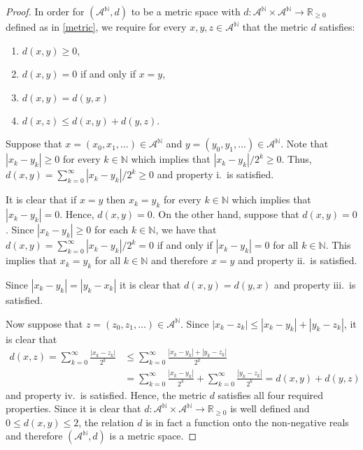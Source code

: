 \begin{proof}
  In order for $(\mathcal{A}^\mathbb{N}, d)$ to be a metric space
  with $d: \mathcal{A}^\mathbb{N} \times \mathcal{A}^\mathbb{N} \to \mathbb{R}_{\geq 0}$
  defined as in \eqref{metric}, we require for every $x, y, z \in \mathcal{A}^\mathbb{N}$ that the metric $d$ satisfies:
  \begin{enumerate}
    \item $d(x, y) \geq 0$,
    \item $d(x, y) = 0$ if and only if $x = y$,
    \item $d(x, y) = d(y, x)$
    \item $d(x, z) \leq d(x, y) + d(y, z)$.
  \end{enumerate}

  Suppose that $x = (x_0, x_1, \dots) \in \mathcal{A}^\mathbb{N}$ and $y = (y_0, y_1, \dots) \in \mathcal{A}^\mathbb{N}$. Note
  that $|x_k - y_k| \geq 0$ for every $k \in \mathbb{N}$ which implies that $|x_k - y_k| / 2^k \geq 0$. Thus,
  $d(x, y) = \sum_{k=0}^\infty |x_k - y_k| / 2^k \geq 0$ and property i.\ is satisfied.

  It is clear that if $x = y$ then $x_k = y_k$ for every $k\in \mathbb{N}$ which implies that
  $|x_k - y_k| = 0$. Hence, $d(x, y) = 0$. On the other hand, suppose that $d(x, y) = 0$.
  Since $|x_k - y_k| \geq 0$ for each $k\in\mathbb{N}$, we have that $d(x, y) = \sum_{k=0}^\infty |x_k - y_k|/2^k = 0$
  if and only if $|x_k - y_k| = 0$ for all $k\in\mathbb{N}$. This implies that
  $x_k = y_k$ for all $k \in \mathbb{N}$ and therefore $x = y$ and property ii.\ is satisfied.

  Since $|x_k - y_k| = |y_k- x_k|$ it is clear that $d(x, y) = d(y, x)$ and property iii.\ is satisfied.

  Now suppose that $z = (z_0, z_1, \dots) \in \mathcal{A}^\mathbb{N}$. Since $|x_k - z_k| \leq |x_k - y_k| + |y_k - z_k|$,
  it is clear that
  \begin{align*}
    d(x, z) = \sum_{k=0}^\infty\frac{|x_k - z_k|}{2^k} &\leq \sum_{k=0}^\infty\frac{|x_k - y_k| + |y_k - z_k|}{2^k} \\
    &=\sum_{k=0}^\infty\frac{|x_k - y_k|}{2^k} + \sum_{k=0}^\infty\frac{|y_k - z_k|}{2^k} = d(x, y) + d(y, z)
  \end{align*}
  and property iv.\ is satisfied. Hence, the metric $d$ satisfies all four required properties.
  Since it is clear that $d: \mathcal{A}^\mathbb{N} \times \mathcal{A}^\mathbb{N} \to \mathbb{R}_{\geq 0}$
  is well defined and $0 \leq d(x, y) \leq 2$, the relation $d$ is in fact a function
  onto the non-negative reals and therefore $(\mathcal{A}^\mathbb{N}, d)$ is a metric space.


\end{proof}
